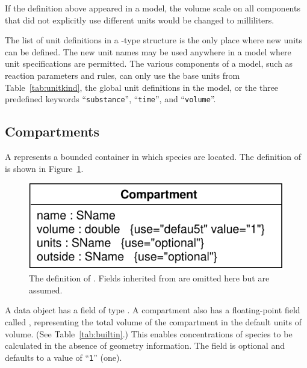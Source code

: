 \documentclass[10pt]{cekarticle}
\newcommand{\vref}[1]{\ref{#1}}
\begin{document}
If the definition above appeared in a model, the volume scale on all
components that did not explicitly use different units would be changed to
milliliters.  

The list of unit definitions in a -type structure is the only
place where new units can be defined.  The new unit names may be used
anywhere in a model where unit specifications are permitted.  The various
components of a model, such as reaction parameters and rules, can only use
the base units from Table~\ref{tab:unitkind}, the global unit definitions
in the model, or the three predefined keywords ``\texttt{substance}'',
``\texttt{time}'', and ``\texttt{volume}''.



\subsection{Compartments}
\label{sec:compartments}

A  represents a bounded container in which species are
located.  The definition of  is shown in
Figure~\vref{fig:compartment}.  

\begin{figure}[htb]
  \vspace*{8pt}
  \centering
  \includegraphics[scale = 0.68]{compartment}
  \caption{The definition of .  
    Fields inherited from  are omitted here but are assumed.}
  \label{fig:compartment}
\end{figure}

A  data object has a  field of type
.  A compartment also has a floating-point field called
, representing the total volume of the compartment in the
default units of volume.  (See Table~\vref{tab:builtin}.)  This enables
concentrations of species to be calculated in the absence of geometry
information.  The  field is optional and defaults to a value
of ``\texttt{1}'' (one).
\end{document}
